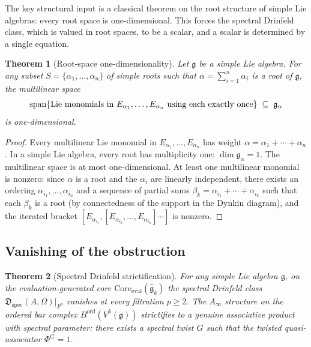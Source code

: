 \documentclass[11pt,reqno]{amsart}
\newtheorem{theorem}{Theorem}[section]
\theoremstyle{definition}
\theoremstyle{remark}
\newcommand{\Ainf}{A_{\infty}}
\newcommand{\fg}{\mathfrak{g}}
\numberwithin{equation}{section}
\begin{document}
The key structural input is a classical theorem on the root
structure of simple Lie algebras: every root space is
one-dimensional.  This forces the spectral Drinfeld class,
which is valued in root spaces, to be a scalar, and a
scalar is determined by a single equation.

\begin{theorem}[Root-space one-dimensionality]
\label{thm:dk-root-space}
Let $\fg$ be a simple Lie algebra.  For any subset
$S = \{\alpha_1, \ldots, \alpha_n\}$ of simple roots such
that $\alpha = \sum_{i=1}^n \alpha_i$ is a root of $\fg$,
the multilinear space
\[
\operatorname{span}\{
\textup{Lie monomials in }E_{\alpha_1}, \ldots, E_{\alpha_n}
\textup{ using each exactly once}
\}
\;\subseteq\;
\fg_\alpha
\]
is one-dimensional.
\end{theorem}

\begin{proof}
Every multilinear Lie monomial in
$E_{\alpha_1}, \ldots, E_{\alpha_n}$ has weight
$\alpha = \alpha_1 + \cdots + \alpha_n$.
In a simple Lie algebra, every root has multiplicity one:
$\dim \fg_\alpha = 1$.  The multilinear space is at most
one-dimensional.  At least one multilinear monomial is
nonzero: since $\alpha$ is a root and the $\alpha_i$ are
linearly independent, there exists an ordering
$\alpha_{i_1}, \ldots, \alpha_{i_n}$ and a sequence of
partial sums
$\beta_k = \alpha_{i_1} + \cdots + \alpha_{i_k}$ such that
each $\beta_k$ is a root (by connectedness of the support
in the Dynkin diagram), and the iterated bracket
$[E_{\alpha_{i_1}}, [E_{\alpha_{i_2}}, \ldots,
E_{\alpha_{i_n}}] \cdots]$ is nonzero.
\end{proof}

\subsection{Vanishing of the obstruction}

\begin{theorem}[Spectral Drinfeld strictification]
\label{thm:dk-strictification}
For any simple Lie algebra $\fg$, on the
evaluation-generated core
${\mathrm{Core}}_{\mathrm{eval}}(\widehat{\mathfrak{g}}_k)$
the spectral Drinfeld
class $\mathfrak{D}_{\mathrm{spec}}(A, \Omega)|_{F^p}$
vanishes at every filtration $p \geq 2$.  The $\Ainf$
structure on the ordered bar complex
$B^{\mathrm{ord}}(V^k(\fg))$ strictifies to a genuine
associative product with spectral parameter: there exists
a spectral twist $G$ such that the twisted quasi-associator
$\Phi^G = 1$.
\end{theorem}
\end{document}
